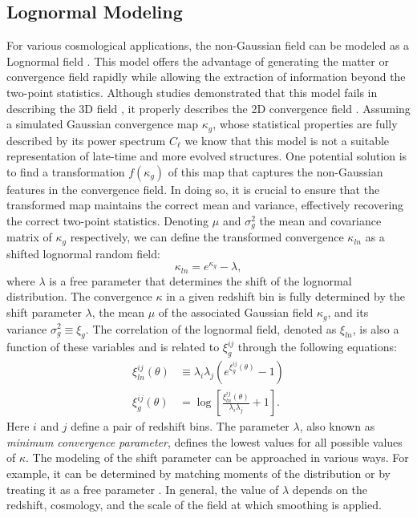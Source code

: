 \documentclass{aa}
\begin{document}
\subsection{Lognormal Modeling}\label{Sec:Lognormal Modeling}
For various cosmological applications, the non-Gaussian field can be modeled as a Lognormal field \citep{coles1991lognormal,bohm2017bayesian}.
This model offers the advantage of generating the matter or convergence field rapidly while allowing the extraction of information beyond the two-point statistics. 
Although studies demonstrated that this model fails in describing the 3D field \citep{klypin2018density}, it properly describes the 2D convergence field \citep{clerkin2017testing, xavier2016improving}.
Assuming a simulated Gaussian convergence map $\kappa_g$, whose statistical properties are fully described by its power spectrum $C_{\ell}$ we know that this model is not a suitable representation of late-time and more evolved structures. One potential solution is to find a transformation $f(\kappa_g)$ of this map that captures the non-Gaussian features in the convergence field. In doing so, it is crucial to ensure that the transformed map maintains the correct mean and variance, effectively recovering the correct two-point statistics.
Denoting $\mu$ and $\sigma_g^2$ the mean and covariance matrix of $\kappa_g$ respectively, we can define the transformed convergence $\kappa_{ln}$ as a shifted lognormal random field:
\begin{equation}\label{Eq:log_norm_kappa}
    \kappa_{ln}=e^{\kappa_{g}}-\lambda, 
\end{equation}
where $\lambda$ is a free parameter that determines the shift of the lognormal distribution. The convergence $\kappa$ in a given redshift bin is fully determined by the shift parameter $\lambda$, the mean $\mu$ of the associated Gaussian field $\kappa_g$, and its variance $\sigma_{g}^2\equiv \xi_g$.
The correlation of the lognormal field, denoted as $\xi_{ln}$, is also a function of these variables and is related to $\xi^{ij}_g$ through the following equations:
\begin{align}
    \xi^{ij}_{ln}(\theta) & \equiv \lambda_i \lambda_j (e^{ \xi^{ij}_g(\theta)}-1) \nonumber \\ 
    \xi^{ij}_g(\theta)&=\log{\left[ \frac{\xi^{ij}_{ln}(\theta)}{\lambda_i \lambda_j}+1\right ]}. \label{Eq:log_norm_corr}
\end{align}
Here $i$ and $j$ define a pair of redshift bins.
The parameter $\lambda$, also known as \textit{minimum convergence
parameter}, defines the lowest values for all possible values of $\kappa$.
The modeling of the shift parameter can be approached in various ways. For example, it can be determined by matching moments of the distribution \citep{xavier2016improving} or by treating it as a free parameter \citep{hilbert2011cosmic}. In general, the value of $\lambda$ depends on the redshift, cosmology, and the scale of the field at which smoothing is applied.
\end{document}

